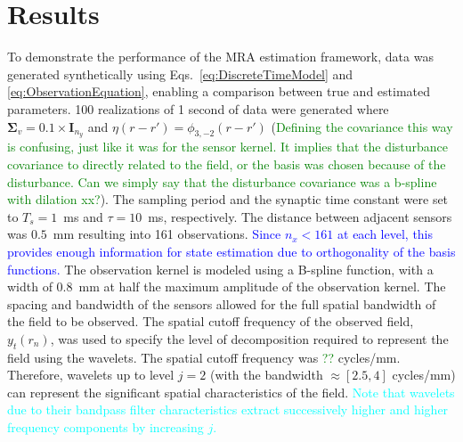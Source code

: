\documentclass[journal,a4paper]{IEEEtran}
\newcommand{\dean}[1]{\textcolor{green}{#1}}
\newcommand{\parham}[1]{\textcolor{blue}{#1}}
\newcommand{\cut}[1]{\textcolor{cyan}{#1}}
\begin{document}
\section{Results}
To demonstrate the performance of the MRA estimation framework, data was generated synthetically  using Eqs.~\ref{eq:DiscreteTimeModel} and \ref{eq:ObservationEquation}, enabling a comparison between true and estimated parameters. 100 realizations of 1 second of data were generated where $\boldsymbol\Sigma_v=0.1 \times \mathbf{I}_{n_y}$ and $\eta(r-r')=\phi_{3,-2}(r-r')$ (\dean{Defining the covariance this way is confusing, just like it was for the sensor kernel. It implies that the disturbance covariance to directly related to the field, or the basis was chosen because of the disturbance. Can we simply say that the disturbance covariance was a b-spline with dilation xx?}). 
The sampling period and the synaptic time constant were set to $T_s = 1$~ms and $\tau = 10$~ms, respectively. The distance between adjacent sensors was $0.5$~mm resulting into 161 observations. \parham{Since $n_x<161$ at each level, this provides enough information for state estimation due to orthogonality of the basis functions.}  The observation kernel is modeled using a B-spline function, with a width of 0.8~mm at half the maximum amplitude of the observation kernel. The spacing and bandwidth of the sensors allowed for the full spatial bandwidth of the field to be observed. The spatial cutoff frequency of the observed field, $y_t(r_n)$, was used to specify the level of decomposition required to represent the field using the wavelets. The spatial cutoff frequency was \dean{??} cycles/mm. Therefore, wavelets up to level $j=2$ (with the bandwidth $\approx[2.5,4]$ cycles/mm) can represent the significant spatial characteristics of the field. \cut{Note that wavelets due to their bandpass filter characteristics extract successively higher and higher frequency components by increasing $j$.}
\end{document}
